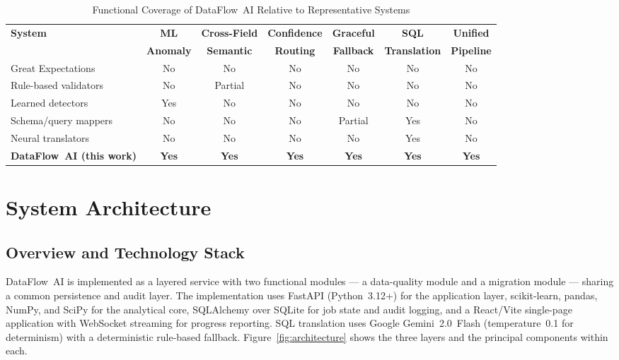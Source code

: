 \documentclass{ieeeaccess}
\begin{document}
\begin{table}[tp]
\centering
\caption{Functional Coverage of DataFlow~AI Relative to Representative Systems}
\label{tab:comparative}
\begin{tabular}{|l|c|c|c|c|c|c|}
\hline
\textbf{System} & \textbf{ML} & \textbf{Cross-Field} & \textbf{Confidence} & \textbf{Graceful} & \textbf{SQL} & \textbf{Unified} \\
 & \textbf{Anomaly} & \textbf{Semantic} & \textbf{Routing} & \textbf{Fallback} & \textbf{Translation} & \textbf{Pipeline} \\
\hline
Great Expectations~\cite{great_expectations} & No & No & No & No & No & No \\
\hline
Rule-based validators~\cite{batini2009data} & No & Partial & No & No & No & No \\
\hline
Learned detectors~\cite{aggarwal2017outlier} & Yes & No & No & No & No & No \\
\hline
Schema/query mappers~\cite{rahm2001survey} & No & No & No & Partial & Yes & No \\
\hline
Neural translators~\cite{manning2008introduction} & No & No & No & No & Yes & No \\
\hline
\textbf{DataFlow~AI (this work)} & \textbf{Yes} & \textbf{Yes} & \textbf{Yes} & \textbf{Yes} & \textbf{Yes} & \textbf{Yes} \\
\hline
\end{tabular}
\end{table}

\section{System Architecture}
\label{sec:architecture}

\subsection{Overview and Technology Stack}
DataFlow~AI is implemented as a layered service with two functional modules --- a data-quality module and a migration
module --- sharing a common persistence and audit layer. The implementation uses FastAPI (Python~3.12+) for the
application layer, scikit-learn, pandas, NumPy, and SciPy for the analytical core, SQLAlchemy over SQLite for job state
and audit logging, and a React/Vite single-page application with WebSocket streaming for progress reporting. SQL
translation uses Google Gemini~2.0~Flash (temperature~0.1 for determinism) with a deterministic rule-based fallback.
Figure~\ref{fig:architecture} shows the three layers and the principal components within each.
\end{document}
